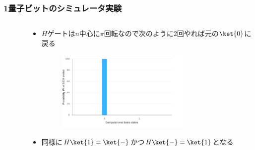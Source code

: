\begin{frame}
  \frametitle{1量子ビットのシミュレータ実験}

  \begin{columns}
    \begin{column}{0.4\textwidth}
      \begin{figure}
        \HGateFigure
      \end{figure}
    \end{column}
    \begin{column}{0.6\textwidth}
      \begin{itemize}
        \item $H$ゲートは$n$中心に$\pi$回転なので次のように2回やれば元の$\ket{0}$に戻る
        \begin{figure}
          \centering
        \end{figure}
        \begin{figure}
          \includegraphics[width=0.7\textwidth]{./img/hgate_hgate_histogram.pdf}
        \end{figure}

        \item 同様に$H\ket{1} = \ket{-}$かつ$H\ket{-} = \ket{1}$となる
      \end{itemize}
    \end{column}
  \end{columns}
\end{frame}

